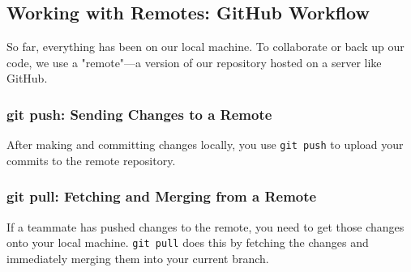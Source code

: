 \documentclass[11pt, a4paper]{article}
\newcommand{\cmd}[1]{\texttt{\textcolor{commandColor}{#1}}}
\begin{document}
\subsection{Working with Remotes: GitHub Workflow}
So far, everything has been on our local machine. To collaborate or back up our code, we use a "remote"—a version of our repository hosted on a server like GitHub.

\subsubsection{git push: Sending Changes to a Remote}
After making and committing changes locally, you use \cmd{git push} to upload your commits to the remote repository.


\subsubsection{git pull: Fetching and Merging from a Remote}
If a teammate has pushed changes to the remote, you need to get those changes onto your local machine. \cmd{git pull} does this by fetching the changes and immediately merging them into your current branch.

\end{document}
